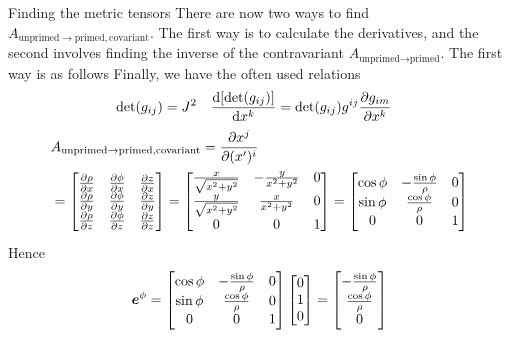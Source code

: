 \documentclass[a4paper, 12pt]{article}
\renewcommand{\arraystretch}{0.8}
\begin{document}
\begin{example}{Finding the metric tensors}
 There are now two ways to find $A_{\text{unprimed}\to \text{primed},
 \text{covariant}}$. The first way is to calculate the derivatives, and the
 second involves finding the inverse of the contravariant $A_{\text{unprimed}\to
 \text{primed}}$. The first way is as follows
 Finally, we have the often used relations
%
\begin{align*}
 &\det(g_{ij}) = J^2&
 &\frac{\text{d}{[\det(g_{ij})]}}{\text{d}{x^k}} = \det(g_{ij})g^{ij}\frac{\partial {g_{im}}}{\partial{x^k}}
\end{align*}
 \renewcommand\arraystretch{2}
 \begin{align*}
  &A_{\text{unprimed}\to \text{primed}, \text{covariant}} =
  \frac{\partial {x^j}}{\partial{(x')^i}}\\
  &=
  \begin{bmatrix}
   \frac{\partial {\rho}}{\partial{x}} & \frac{\partial {\phi}}{\partial{x}} & \frac{\partial {z}}{\partial{x}}\\
   \frac{\partial {\rho}}{\partial{y}} & \frac{\partial {\phi}}{\partial{y}} & \frac{\partial {z}}{\partial{y}}\\
   \frac{\partial {\rho}}{\partial{z}} & \frac{\partial {\phi}}{\partial{z}} & \frac{\partial {z}}{\partial{z}}
  \end{bmatrix}
  =
  \begin{bmatrix}
   \frac{x}{\sqrt{x^2+y^2}} & -\frac{y}{x^2+y^2} & 0\\
   \frac{y}{\sqrt{x^2+y^2}} & \frac{x}{x^2+y^2} & 0\\
   0 & 0 & 1
  \end{bmatrix}
  =
  \begin{bmatrix}
   \cos\phi & -\frac{\sin\phi}{\rho} & 0\\
   \sin\phi & \frac{\cos\phi}{\rho} & 0\\
   0 & 0 & 1
  \end{bmatrix}
 \end{align*}
 Hence
 \renewcommand\arraystretch{1}
 \begin{align*}
  \ve{e}^{\phi} =
  \begin{bmatrix}
   \cos\phi & -\frac{\sin\phi}{\rho} & 0\\
   \sin\phi & \frac{\cos\phi}{\rho} & 0\\
   0 & 0 & 1
  \end{bmatrix}
  \begin{bmatrix}
   0\\
   1\\
   0
  \end{bmatrix}
  =
  \begin{bmatrix}
   -\frac{\sin\phi}{\rho}\\
   \frac{\cos\phi}{\rho}\\
   0
  \end{bmatrix}

\end{align*}
\end{example}
\end{document}
